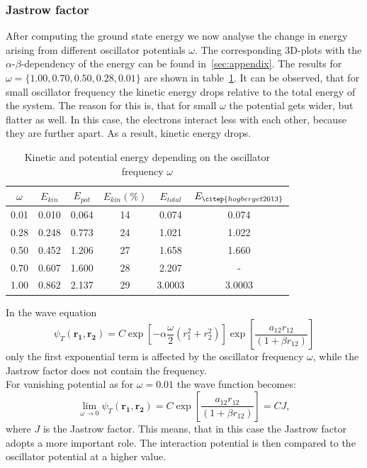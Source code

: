 \subsubsection{Jastrow factor}\label{sec:Jastro}
After computing the ground state energy we now analyse the change in energy arising from different oscillator potentials $\omega$. The corresponding 3D-plots with the $\alpha$-$\beta$-dependency of the energy can be found in~\ref{sec:appendix}. The results for $\omega =\{1.00, 0.70, 0.50,0.28,0.01\}$ are shown in table~\ref{tab:omega}. It can be observed, that for small oscillator frequency the kinetic energy drops relative to the total energy of the system. The reason for this is, that for small $\omega$ the potential gets wider, but flatter as well. In this case, the electrons interact less with each other, because they are further apart. As a result, kinetic energy drops.\\
\begin{table}[H]
\centering
\caption{Kinetic and potential energy depending on the oscillator frequency $\omega$}
    \begin{tabular}{c|cc|c|c|c}
   \toprule
    $\omega$ & $E_{kin}$  & $E_{pot}$  & $E_{kin} (\%)$ & $E_{total}$ & $E_{\citep{hogberget2013}}$ \\ 
    \midrule
    0.01   & 0.010 & 0.064 & 14   & 0.074    & 0.074   \\
    0.28   & 0.248  & 0.773  & 24   & 1.021   & 1.022  \\
    0.50    & 0.452  & 1.206   & 27   & 1.658  & 1.660    \\
    0.70    & 0.607  & 1.600   & 28   &  2.207    & -   \\
    1.00      & 0.862  & 2.137   & 29   & 3.0003  & 3.0003    \\
    \bottomrule
    \end{tabular}
\label{tab:omega}
\end{table}
In the wave equation
\begin{equation}
\psi_T(\mathbf{r_1,r_2}) = C \exp\left[-\alpha\frac{\omega}{2} (r_1^2+r_2^2)\right] \exp \left[ \frac{a_{12} r_{12}}{(1+\beta r_{12})} \right]
\end{equation}
only the first exponential term is affected by the oscillator frequency $\omega$, while the Jastrow factor does not contain the frequency.\\
For vanishing potential as for $\omega =0.01$ the wave function becomes:
\begin{equation}
\lim_{\omega\rightarrow 0} \psi_T(\mathbf{r_1,r_2}) = C \exp \left[ \frac{a_{12} r_{12}}{(1+\beta r_{12})} \right] = C J,
\end{equation}
where $J$ is the Jastrow factor. This means, that in this case the Jastrow factor adopts a more important role. The interaction potential is then compared to the oscillator potential at a higher value.
